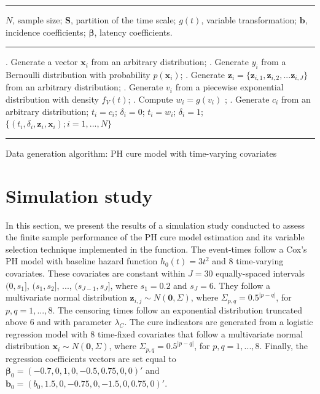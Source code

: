 \algnewcommand{}
\begin{table}[ht]
  \begin{algorithmic}
  \hrule
    \Require $N$, sample size; $\mathbf{S}$, partition of the time scale; $g(t)$, variable transformation; $\mathbf{b}$, incidence coefficients; $\boldsymbol{\beta}$, latency coefficients.
  \hrule
      . Generate a vector $\mathbf{x}_i$ from an arbitrary distribution; %
      . Generate $y_i$ from a Bernoulli distribution with probability $p(\mathbf{x}_i)$; %
      . Generate $\mathbf{z}_{i}=\{\mathbf{z}_{i,1},\mathbf{z}_{i,2},...\mathbf{z}_{i,J}\}$ from an arbitrary distribution; %
      . Generate $v_i$ from a piecewise exponential distribution with density $f_V(t)$;
      . Compute $w_i = g(v_i)$ ; %
      . Generate $c_i$ from an arbitrary distribution; %
        \State $t_i = c_i$;
        \State $\delta_i=0$;  
      \Else
        \State $t_i = w_i$;
        \State $\delta_i=1$;
      \EndIf
    \EndFor \\
    \Return $\{(t_i,\delta_i,\mathbf{z}_i,\mathbf{x}_i); i=1,...,N\}$
  \hrule
  \end{algorithmic}
\caption{Data generation algorithm: PH cure model with time-varying covariates}
\label{algo:datagen}
\end{table}










\section{Simulation study} 

In this section, we present the results of a simulation study conducted to assess the finite sample performance of the PH cure model estimation and its variable selection technique implemented in the  function. 
The event-times follow a Cox's PH model with baseline hazard function $h_0(t)=3t^2$ and 8 time-varying covariates. These covariates are constant within $J=30$ equally-spaced intervals $(0,s_1]$, $(s_1,s_2]$, $...$, $(s_{J-1},s_J]$, where $s_1=0.2$ and $s_J=6$.
They follow a multivariate normal distribution $\mathbf{z}_{i,j}\sim N(\mathbf{0},\boldsymbol{\varSigma})$, where $\varSigma_{p,q}=0.5^{|p-q|}$, for $p,q=1,...,8$.
The censoring times follow an exponential distribution truncated above $6$ and with parameter $\lambda_C$. The cure indicators are generated from a logistic regression model with 8 time-fixed covariates that follow a multivariate normal distribution $\mathbf{x}_{i}\sim N(\mathbf{0},\boldsymbol{\varSigma})$, where $\varSigma_{p,q}=0.5^{|p-q|}$, for $p,q=1,...,8$. Finally, the regression coefficients vectors are set equal to $\boldsymbol{\beta}_0=(-0.7,0,1,0,-0.5,0.75,0,0)'$ and $\mathbf{b}_0=(b_0,1.5,0,-0.75,0,-1.5,0,0.75,0)'$.

